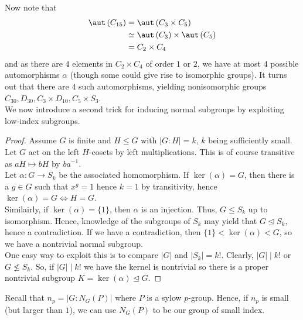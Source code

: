 Now note that
\begin{align*}
	\aut \left( C_{15} \right)  &= \aut \left( C_3 \times C_5 \right) \\
				    & \simeq \aut \left( C_3 \right)  \times \aut \left( C_5 \right) \\
				    &=  C_2 \times C_4 \\
\end{align*}
and as there are \(4\) elements in \(C_2 \times C_4\) of order \(1\) or \(2\), we have at most \(4\) possible automorphisms \(\alpha\) (though some could give rise to isomorphic groups). It turns out that there are \(4\) such automorphisms, yielding nonisomorphic groups \(C_{30}, D_{30}, C_3 \times D_{10}, C_5 \times S_3\).\\
We now introduce a second trick for inducing normal subgroups by exploiting low-index subgroups.\\
\begin{proof}
Assume \(G\) is finite and \(H \le G\)	 with \(\left| G : H \right|  = k\), \(k\) being sufficiently small. Let \(G\) act on the left \(H\)-cosets by left multiplications. This is of course transitive as \(aH \mapsto bH\) by \(ba^{-1}\).\\
Let \(\alpha : G \to S_{k}\) be the associated homomorphism. If \(\ker \left( \alpha \right)  = G\), then there is a \(g \in G\) such that \(x^{g} = 1\) hence \(k =1\) by transitivity, hence \(\ker \left( \alpha \right)  = G \iff H = G\).\\
Similairly, if \(\ker \left( \alpha \right)  = \{1\} \), then \(\alpha\) is an injection. Thus, \(G \le S_{k}\)  up to isomorphism. Hence, knowledge of the subgroups of \(S_{k}\)  may yield that \(G \trianglelefteq S_{k}\), hence a contradiction. If we have a contradiction, then \(\{1\}  < \ker \left( \alpha \right)  < G\), so we have a nontrivial normal subgroup.\\
One easy way to exploit this is to compare \(\left| G \right| \) and \(\left| S_{k} \right| = k!\). Clearly, \(\left| G \right|  \mid k!\) or \(G \not\le S_{k}\). So, if \(\left| G \right| \mid k!\) we have the kernel is nontrivial so there is a proper nontrivial subgroup \(K = \ker \left( \alpha \right)  \trianglelefteq G\).
\end{proof}
\begin{example}
	Recall that \(n_{p} = \left| G :N_{G}\left( P \right)  \right| \) where \(P\) is a sylow \(p\)-group. Hence, if \(n_{p}\) is small (but larger than \(1\)), we can use \(N_{G}\left( P \right) \) to be our group of small index.
\end{example}
